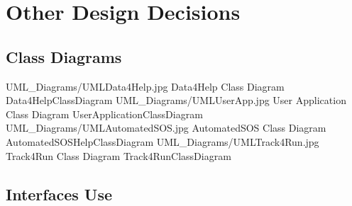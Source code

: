 \documentclass[../../DD.tex]{subfiles}
\begin{document}
\section{Other Design Decisions}
	\subsection{Class Diagrams}
	\image {13cm} {UML_Diagrams/UMLData4Help.jpg} {Data4Help Class Diagram} {Data4HelpClassDiagram}
	\image {13cm} {UML_Diagrams/UMLUserApp.jpg} {User Application Class Diagram} {UserApplicationClassDiagram}
	\image {13cm} {UML_Diagrams/UMLAutomatedSOS.jpg} {AutomatedSOS Class Diagram} {AutomatedSOSHelpClassDiagram}
	\image {13cm} {UML_Diagrams/UMLTrack4Run.jpg} {Track4Run Class Diagram} {Track4RunClassDiagram}

	\subsection{Interfaces Use}
\end{document}
